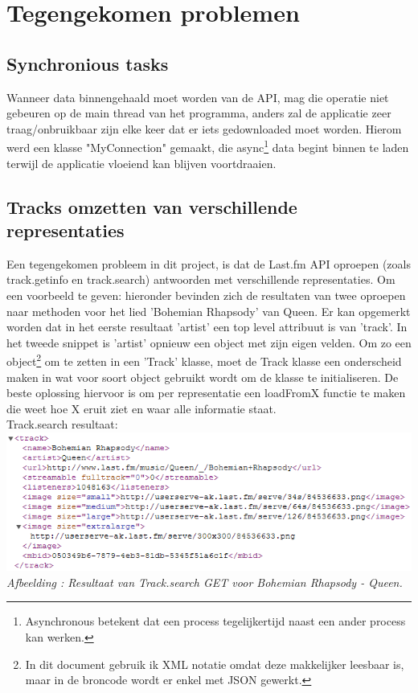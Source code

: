 \documentclass[11pt,a4paper]{article}
\newcounter{figc}
\newcommand{\figID} {%
   \stepcounter{figc}%
   \thefigc}
\begin{document}
	\newpage
\section{Tegengekomen problemen}

	\subsection{Synchronious tasks}
	Wanneer data binnengehaald moet worden van de API, mag die operatie niet gebeuren op de main thread van het programma, anders zal de applicatie zeer traag/onbruikbaar zijn elke keer dat er iets gedownloaded moet worden. Hierom werd een klasse "MyConnection" gemaakt, die async\footnote{Asynchronous betekent dat een process tegelijkertijd naast een ander process kan werken.} data begint binnen te laden terwijl de applicatie vloeiend kan blijven voortdraaien.
	
	\subsection{Tracks omzetten van verschillende representaties}
	Een tegengekomen probleem in dit project, is dat de Last.fm API oproepen (zoals track.getinfo en track.search) antwoorden met verschillende representaties. Om een voorbeeld te geven: hieronder bevinden zich de resultaten van twee oproepen naar methoden voor het lied 'Bohemian Rhapsody' van Queen. Er kan opgemerkt worden dat in het eerste resultaat 'artist' een top level attribuut is van 'track'. In het tweede snippet is 'artist' opnieuw een object met zijn eigen velden. Om zo een object\footnote{In dit document gebruik ik XML notatie omdat deze makkelijker leesbaar is, maar in de broncode wordt er enkel met JSON gewerkt.} om te zetten in een 'Track' klasse, moet de Track klasse een onderscheid maken in wat voor soort object gebruikt wordt om de klasse te initialiseren. De beste oplossing hiervoor is om per representatie een loadFromX functie te maken die weet hoe X eruit ziet en waar alle informatie staat. \\
	
	Track.search resultaat:\\
	\includegraphics[width=15cm]{Pictures/track_search.png} \\ \newline
	\small \textit{Afbeelding \figID : Resultaat van Track.search GET voor Bohemian Rhapsody - Queen.} \\
\end{document}

